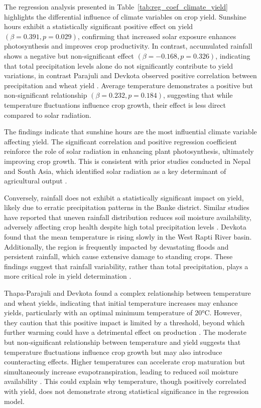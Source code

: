 The regression analysis presented in Table~\ref{tab:reg_coef_climate_yield} highlights the differential influence of climate variables on crop yield. Sunshine hours exhibit a statistically significant positive effect on yield $(\beta = 0.391, p = 0.029)$, confirming that increased solar exposure enhances photosynthesis and improves crop productivity. In contrast, accumulated rainfall shows a negative but non-significant effect $(\beta = -0.168, p = 0.326)$, indicating that total precipitation levels alone do not significantly contribute to yield variations, in contrast Parajuli and Devkota  observed positive correlation between precipitation and wheat yield \citep{thapa-parajuliImpactClimateChange2016}. Average temperature demonstrates a positive but non-significant relationship $(\beta = 0.232, p = 0.184)$, suggesting that while temperature fluctuations influence crop growth, their effect is less direct compared to solar radiation.

The findings indicate that sunshine hours are the most influential climate variable affecting yield. The significant correlation and positive regression coefficient reinforce the role of solar radiation in enhancing plant photosynthesis, ultimately improving crop growth. This is consistent with prior studies conducted in Nepal and South Asia, which identified solar radiation as a key determinant of agricultural output \citep{thapa-parajuliImpactClimateChange2016}.

Conversely, rainfall does not exhibit a statistically significant impact on yield, likely due to erratic precipitation patterns in the Banke district. Similar studies have reported that uneven rainfall distribution reduces soil moisture availability, adversely affecting crop health despite high total precipitation levels \citep{regmiCropYieldResponse2019}. Devkota found that the mean temperature is rising slowly in the West Rapti River basin. Additionally, the region is frequently impacted by devastating floods and persistent rainfall, which cause extensive damage to standing crops. These findings suggest that rainfall variability, rather than total precipitation, plays a more critical role in yield determination \citep{devkotaClimateChangeTrends2014}.

Thapa-Parajuli and Devkota found a complex relationship between temperature and wheat yields, indicating that initial temperature increases may enhance yields, particularly with an optimal minimum temperature of 20°C. However, they caution that this positive impact is limited by a threshold, beyond which further warming could have a detrimental effect on production \citep{thapa-parajuliImpactClimateChange2016}.
The moderate but non-significant relationship between temperature and yield suggests that temperature fluctuations influence crop growth but may also introduce counteracting effects. Higher temperatures can accelerate crop maturation but simultaneously increase evapotranspiration, leading to reduced soil moisture availability \citep{shresthaFarmersPerceptionClimate2022}. This could explain why temperature, though positively correlated with yield, does not demonstrate strong statistical significance in the regression model.

